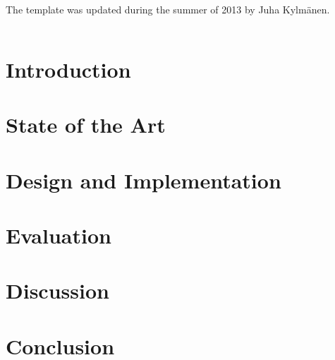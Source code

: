 \documentclass[a4paper, 12pt,titlepage]{dithesis}
\begin{document}
The template was updated during the summer of 2013 by Juha Kylmänen.


\setlongtables
\begin{longtable}[l]{p{3cm}p{}}



\end{longtable}
\setcounter{table}{0}

\chapter{Introduction}
\sivunumerot

\chapter{State of the Art}

\chapter{Design and Implementation}

\chapter{Evaluation}

\chapter{Discussion}

\chapter{Conclusion}



\end{document}

